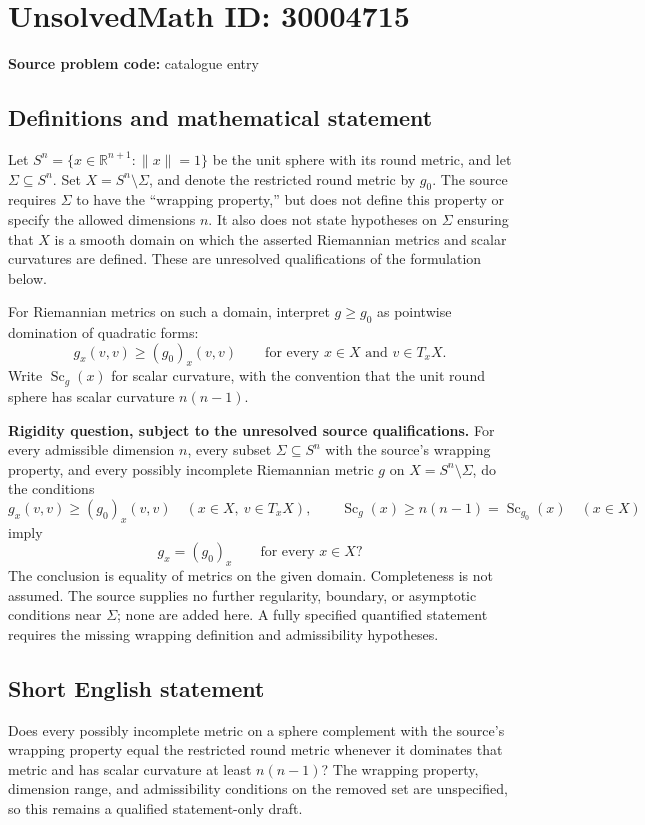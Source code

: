 \documentclass[11pt]{article}
\newcommand{\R}{\mathbb{R}}
\begin{document}
\section*{UnsolvedMath ID: 30004715}
\textbf{Source problem code:} catalogue entry
\subsection{Definitions and mathematical statement}
Let \(S^n=\{x\in\R^{n+1}:\lVert x\rVert=1\}\) be the unit sphere with its round metric, and let \(\Sigma\subseteq S^n\). Set \(X=S^n\setminus\Sigma\), and denote the restricted round metric by \(g_0\). The source requires \(\Sigma\) to have the ``wrapping property,'' but does not define this property or specify the allowed dimensions \(n\). It also does not state hypotheses on \(\Sigma\) ensuring that \(X\) is a smooth domain on which the asserted Riemannian metrics and scalar curvatures are defined. These are unresolved qualifications of the formulation below.

For Riemannian metrics on such a domain, interpret \(g\geq g_0\) as pointwise domination of quadratic forms:
\[
 g_x(v,v)\geq (g_0)_x(v,v)
 \qquad\text{for every }x\in X\text{ and }v\in T_xX.
\]
Write \(\operatorname{Sc}_g(x)\) for scalar curvature, with the convention that the unit round sphere has scalar curvature \(n(n-1)\).

\textbf{Rigidity question, subject to the unresolved source qualifications.} For every admissible dimension \(n\), every subset \(\Sigma\subseteq S^n\) with the source's wrapping property, and every possibly incomplete Riemannian metric \(g\) on \(X=S^n\setminus\Sigma\), do the conditions
\[
 g_x(v,v)\geq (g_0)_x(v,v)
 \quad(x\in X,\ v\in T_xX),
 \qquad
 \operatorname{Sc}_g(x)\geq n(n-1)=\operatorname{Sc}_{g_0}(x)
 \quad(x\in X)
\]
imply
\[
 g_x=(g_0)_x\qquad\text{for every }x\in X?
\]
The conclusion is equality of metrics on the given domain. Completeness is not assumed. The source supplies no further regularity, boundary, or asymptotic conditions near \(\Sigma\); none are added here. A fully specified quantified statement requires the missing wrapping definition and admissibility hypotheses.
\subsection{Short English statement}
Does every possibly incomplete metric on a sphere complement with the source's wrapping property equal the restricted round metric whenever it dominates that metric and has scalar curvature at least \(n(n-1)\)? The wrapping property, dimension range, and admissibility conditions on the removed set are unspecified, so this remains a qualified statement-only draft.
\end{document}
